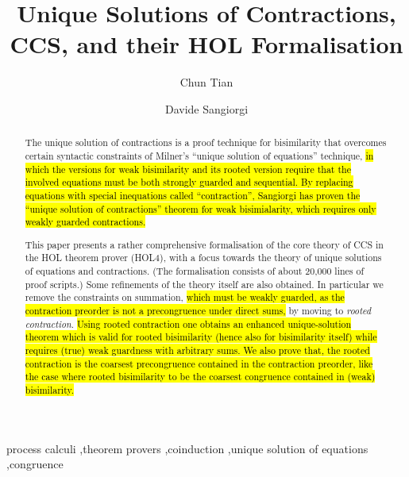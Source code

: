 \documentclass[3p]{elsarticle}
\begin{document}
\begin{frontmatter}

\title{Unique Solutions of Contractions, CCS, and their HOL
  Formalisation}

\author[mymainaddress]{Chun Tian}%
\address[mymainaddress]{Universit\`a di Trento and Fondazione Bruno
  Kessler, Italy}

\author[mysecondaryaddress]{Davide Sangiorgi}
\address[mysecondaryaddress]{Universit\`a di Bologna and INRIA, Italy}

\begin{abstract}
  The unique solution of contractions is a proof technique for
  bisimilarity that overcomes certain syntactic constraints of
  Milner's ``unique solution of equations'' technique, \hl{in which the
  versions for weak bisimilarity and its rooted version require that
  the involved equations must be both strongly guarded and
  sequential. By replacing
  equations with special inequations called ``contraction'', Sangiorgi
  has proven the ``unique solution of contractions'' theorem for weak
  bisimialarity, which requires only weakly guarded contractions.}

  This paper presents a rather comprehensive formalisation of the
  core theory of CCS in the HOL theorem prover (HOL4), with a
  focus towards the theory of unique solutions of equations and contractions.  (The
  formalisation consists of about 20,000 lines of proof scripts.)
  Some refinements of the theory itself are also obtained.
  In particular we remove the constraints on summation,
  \hl{which must be weakly guarded, as the contraction
  preorder is not a precongruence under direct sums,} by moving to \emph{rooted
  contraction}. \hl{Using rooted contraction one obtains an enhanced
  unique-solution theorem which is valid for rooted bisimilarity
  (hence also for bisimilarity itself) while requires (true) weak
  guardness with arbitrary sums.
  We also prove that, the rooted contraction is the coarsest
  precongruence contained in the contraction preorder, like the
  case where rooted bisimilarity to be the coarsest congruence contained
  in (weak) bisimilarity.}
\end{abstract}

\begin{keyword}
process calculi \sep theorem provers \sep coinduction \sep unique
solution of equations \sep congruence
\end{keyword}

\end{frontmatter}
\end{document}
